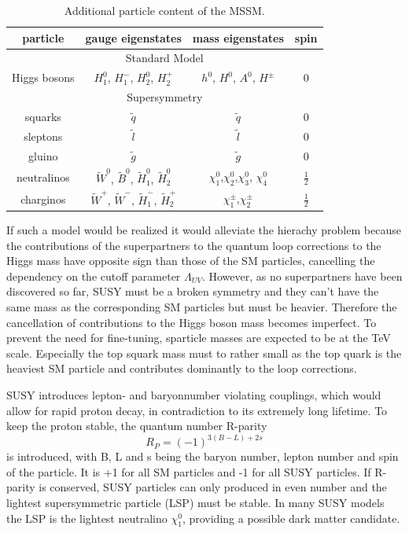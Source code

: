 \begin{table}
\centering
 \renewcommand{\arraystretch}{1.3}
\caption{Additional particle content of the MSSM.}
\label{tab:MSSM}
\begin{tabular}{c|c|c|c}
particle & gauge eigenstates  & mass eigenstates & spin   \\
\hline
\multicolumn{4}{c}{Standard Model} \\
\hline
Higgs bosons & $H_1^0$, $H_1^{-}$, $H_2^0$, $H_2^+$ & $h^0$, $H^0$, $A^0$, $H^{\pm}$ & 0 \\
\hline
\multicolumn{4}{c}{Supersymmetry} \\
\hline
squarks & $\tilde{q}$ & $\tilde{q}$ & 0 \\
sleptons & $\tilde{l}$ & $\tilde{l}$ & 0 \\
 gluino & $\tilde{g}$ & $\tilde{g}$ & 0 \\
neutralinos & $\tilde{W}^0$, $\tilde{B}^0$, $\tilde{H}_1^0$, $\tilde{H}_2^0$ & $\chi^0_1$,$\chi^0_2$,$\chi^0_3$, $\chi^0_4$ & $\frac{1}{2}$\\
charginos & $\tilde{W}^+$, $\tilde{W}^-$, $\tilde{H}_1^-$, $\tilde{H}_2^+$ & $\chi^{\pm}_1$,$\chi^{\pm}_2$ & $\frac{1}{2}$ \\ 
\end{tabular}
\end{table} 

If such a model would be realized it would alleviate the hierachy problem because the contributions of the superpartners to the quantum loop corrections to the Higgs mass have opposite sign than those of the SM particles, cancelling the dependency on the cutoff parameter $\Lambda_{UV}$. However, as no superpartners have been discovered so far, SUSY must be a broken symmetry and they can't have the same mass as the corresponding SM particles but must be heavier. Therefore the cancellation of contributions to the Higgs boson mass becomes imperfect. To prevent the need for fine-tuning, sparticle masses are expected to be at the TeV scale. Especially the top squark mass must to rather small as the top quark is the heaviest SM particle and contributes dominantly to the loop corrections. 

SUSY introduces lepton- and baryonnumber violating couplings, which would allow for rapid proton decay, in contradiction to its extremely long lifetime. To keep the proton stable, the quantum number R-parity
\begin{equation}
R_P = (-1)^{3(B-L)+2s}
\end{equation} 
is introduced, with B, L and s being the baryon number, lepton number and spin of the particle. It is +1 for all SM particles and -1 for all SUSY particles. If R-parity is conserved, SUSY particles can only produced in even number and the lightest supersymmetric particle (LSP) must be stable. In many SUSY models the LSP is the lightest neutralino $\chi^0_1$, providing a possible dark matter candidate. 


